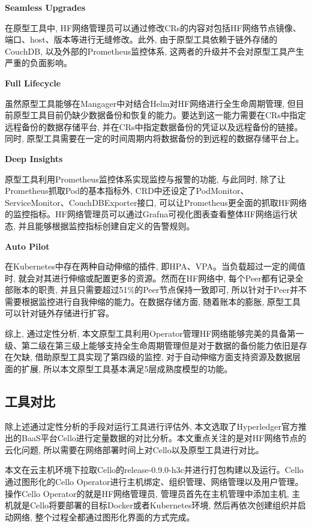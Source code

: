 \textbf{Seamless Upgrades}

在原型工具中, HF网络管理员可以通过修改CRs的内容对包括HF网络节点镜像、端口、host、版本等进行无缝修改。此外, 由于原型工具依赖于链外存储的CouchDB, 以及外部的Prometheus监控体系, 这两者的升级并不会对原型工具产生严重的负面影响。 

\textbf{Full Lifecycle}

虽然原型工具能够在Mangager中对结合Helm对HF网络进行全生命周期管理, 但目前原型工具目前仍缺少数据备份和恢复的能力。要达到这一能力需要在CRs中指定远程备份的数据存储平台, 并在CRs中指定数据备份的凭证以及远程备份的链接。同时, 原型工具需要在一定的时间周期内将数据备份的到远程的数据存储平台上。

\textbf{Deep Insights}

原型工具利用Prometheus监控体系实现监控与报警的功能, 与此同时, 除了让Prometheus抓取Pod的基本指标外, CRD中还设定了PodMonitor、ServiceMonitor、CouchDBExporter接口, 可以让Prometheus更全面的抓取HF网络的监控指标。HF网络管理员可以通过Grafna可视化图表查看整体HF网络运行状态, 并且能够根据监控指标创建自定义的告警规则。

\textbf{Auto Pilot}

在Kubernetes中存在两种自动伸缩的插件, 即HPA、VPA。当负载超过一定的阈值时, 就会对其进行伸缩或配置更多的资源。然而在HF网络中, 每个Peer都有记录全部账本的职责, 并且只需要超过51\%的Peer节点保持一致即可, 所以针对于Peer并不需要根据监控进行自我伸缩的能力。在数据存储方面, 随着账本的膨胀, 原型工具可以针对链外存储进行扩容。

综上, 通过定性分析, 本文原型工具利用Operator管理HF网络能够完美的具备第一级、第二级在第三级上能够支持全生命周期管理但是对于数据的备份能力依旧是存在欠缺, 借助原型工具实现了第四级的监控, 对于自动伸缩方面支持资源及数据层面的扩展, 所以本文原型工具基本满足5层成熟度模型的功能。

\subsection{工具对比} \label{section: tool_comparison}

除上述通过定性分析的手段对运行工具进行评估外, 本文选取了Hyperledger官方推出的BaaS平台Cello进行定量数据的对比分析。本文重点关注的是对HF网络节点的云化问题, 所以需要在网络部署时间上对Cello以及原型工具进行对比。

本文在云主机环境下拉取Cello的release-0.9.0-h3c并进行打包构建以及运行。Cello通过图形化的Cello Operator进行主机绑定、组织管理、网络管理以及用户管理。操作Cello Operator的就是HF网络管理员, 管理员首先在主机管理中添加主机, 主机就是Cello将要部署的目标Docker或者Kubernetes环境, 然后再依次创建组织并启动网络, 整个过程全都通过图形化界面的方式完成。

